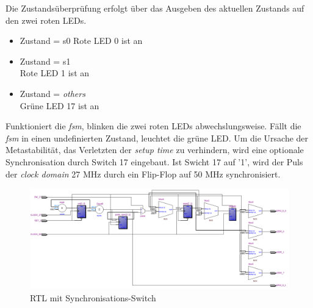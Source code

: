 Die Zustandsüberprüfung erfolgt über das Ausgeben des aktuellen Zustands auf den zwei roten LEDs. 
\begin{itemize}
	\item Zustand = s0
	\newline Rote LED 0 ist an
	\item Zustand = s1\\
	 Rote LED 1 ist an
	\item Zustand = \textit{others}\\
	 Grüne LED 17 ist an\\
\end{itemize}

Funktioniert die \textit{fsm}, blinken die zwei roten LEDs abwechslungsweise. Fällt die \textit{fsm} in einen undefinierten Zustand, leuchtet die grüne LED. Um die Ursache der Metastabilität, das Verletzten der \textit{setup time} zu verhindern, wird eine optionale Synchronisation durch Switch 17 eingebaut. Ist Swicht 17  auf '1', wird der Puls der \textit{clock domain} 27 MHz durch ein Flip-Flop auf 50 MHz synchronisiert.

\begin{figure}[H]
	\centering
	\includegraphics[width=1\textwidth]{images/metastability/RtL_metastaibility.png}
	\caption{RTL mit Synchronisations-Switch}
	\label{fig.metastabil.RtL}
\end{figure}



